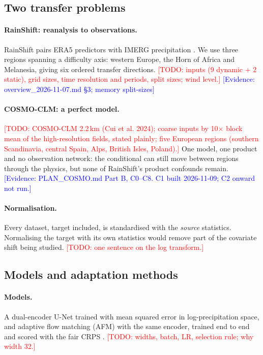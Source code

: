 \documentclass{ametsocV6.2}
\newcommand{\todo}[1]{\textcolor{red}{[TODO: #1]}}
\newcommand{\ev}[1]{\textcolor{blue}{[Evidence: #1]}}
\begin{document}
\subsection{Two transfer problems}\label{sec:data}

\paragraph{RainShift: reanalysis to observations.} RainShift
\citep{harder2025rainshift} pairs ERA5 predictors
\citep{hersbach2020era5} with IMERG precipitation
\citep{huffman2023imerg}. We use three regions spanning a difficulty
axis: western Europe, the Horn of Africa and Melanesia, giving six
ordered transfer directions. \todo{inputs (9 dynamic + 2 static), grid
sizes, time resolution and periods, split sizes; wind level.}
\ev{overview\_2026-11-07.md \S3; memory split-sizes}

\paragraph{COSMO-CLM: a perfect model.} \todo{COSMO-CLM 2.2\,km
(Cui et al. 2024); coarse inputs by 10$\times$ block mean of the
high-resolution fields, stated plainly; five European regions (southern
Scandinavia, central Spain, Alps, British Isles, Poland).} One model, one
product and no observation network: the conditional can still move
between regions through the physics, but none of RainShift's product
confounds remain. \ev{PLAN\_COSMO.md Part B, C0--C8. C1 built 2026-11-09;
C2 onward not run.}

\paragraph{Normalisation.} Every dataset, target included, is
standardised with the \emph{source} statistics. Normalising the target
with its own statistics would remove part of the covariate shift being
studied. \todo{one sentence on the log transform.}

\subsection{Models and adaptation methods}\label{sec:methods}

\paragraph{Models.} A dual-encoder U-Net trained with mean squared error
in log-precipitation space, and adaptive flow matching (AFM)
\citep{fotiadis2025adaptive,lipman2023flow} with the same encoder, trained
end to end and scored with the fair CRPS
\citep{gneiting2007scoring,ferro2014fair}. \todo{widths, batch, LR,
selection rule; why width 32.}
\end{document}
